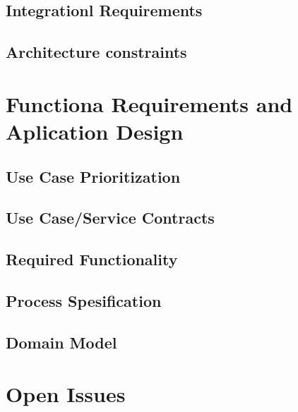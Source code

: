 \documentclass[12pt]{article}
\begin{document}
\subsection{Integrationl Requirements}

\subsection{Architecture constraints}

\section{Functiona Requirements and Aplication Design}

\subsection{Use Case Prioritization}

\subsection{Use Case/Service Contracts}

\subsection{Required Functionality}

\subsection{Process Spesification}

\subsection{Domain Model}


\section{Open Issues}
\end{document}
